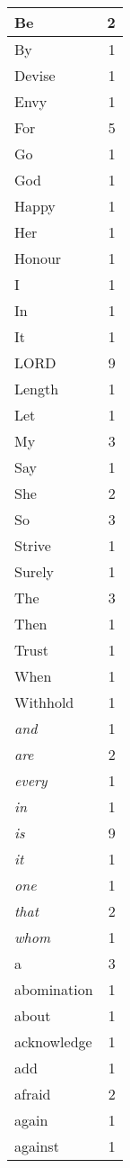 \begin{center}
\begin{longtable}{l|r}
Be & 2\\ \hline 
By & 1\\ \hline 
Devise & 1\\ \hline 
Envy & 1\\ \hline 
For & 5\\ \hline 
Go & 1\\ \hline 
God & 1\\ \hline 
Happy & 1\\ \hline 
Her & 1\\ \hline 
Honour & 1\\ \hline 
I & 1\\ \hline 
In & 1\\ \hline 
It & 1\\ \hline 
LORD & 9\\ \hline 
Length & 1\\ \hline 
Let & 1\\ \hline 
My & 3\\ \hline 
Say & 1\\ \hline 
She & 2\\ \hline 
So & 3\\ \hline 
Strive & 1\\ \hline 
Surely & 1\\ \hline 
The & 3\\ \hline 
Then & 1\\ \hline 
Trust & 1\\ \hline 
When & 1\\ \hline 
Withhold & 1\\ \hline 
\emph{and} & 1\\ \hline 
\emph{are} & 2\\ \hline 
\emph{every} & 1\\ \hline 
\emph{in} & 1\\ \hline 
\emph{is} & 9\\ \hline 
\emph{it} & 1\\ \hline 
\emph{one} & 1\\ \hline 
\emph{that} & 2\\ \hline 
\emph{whom} & 1\\ \hline 
a & 3\\ \hline 
abomination & 1\\ \hline 
about & 1\\ \hline 
acknowledge & 1\\ \hline 
add & 1\\ \hline 
afraid & 2\\ \hline 
again & 1\\ \hline 
against & 1\\ \hline 

\end{longtable}
\end{center}

